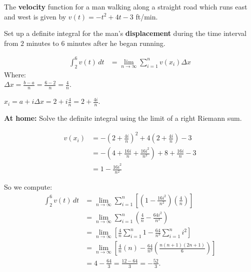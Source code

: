\documentclass[nooutcomes]{ximera}
\renewenvironment{freeResponse}{
\ifhandout\setbox0\vbox\bgroup\else
\begin{trivlist}\item[\hskip \labelsep\bfseries Solution:\hspace{2ex}]
\fi}
{\ifhandout\egroup\else
\end{trivlist}
\fi}
\renewcommand{\d}{\,d}
\newcommand{\dfn}{\textbf}
\begin{document}
\begin{problem}
  The \dfn{velocity} function for a man walking along a straight road which runs east and west is given by $v(t) = -t^2 + 4t - 3$ ft/min.
  \begin{enumerate}
    
  \item  Set up a definite integral for the man's \dfn{displacement} during the time interval from $2$ minutes to $6$ minutes after he began running.
    \begin{freeResponse}
      \begin{align*}
        \int_2^6 v(t) \d t &= \lim_{n \to \infty} \sum_{i=1}^n v(x_i) \Delta x
      \end{align*}
      Where:  \\	
      $\Delta x = \frac{b-a}{n} = \frac{6-2}{n} = \frac{4}{n}$.
      
      $x_i = a + i \Delta x = 2 + i \frac{4}{n} = 2 + \frac{4i}{n}$.
    \end{freeResponse}
    
  \item  \dfn{At home:}  Solve the definite integral using the limit of a right Riemann sum.
    \begin{freeResponse}
      \begin{align*}
        v(x_i) &= -\left(2 + \frac{4i}{n} \right)^2 + 4 \left( 2 + \frac{4i}{n} \right) - 3  \\
               &= - \left( 4 + \frac{16i}{n} + \frac{16i^2}{n^2} \right) + 8 + \frac{16i}{n} - 3  \\
               &= 1 - \frac{16i^2}{n^2}
      \end{align*}
      
      So we compute:
      \begin{align*}
        \int_2^6 v(t) \d t &= \lim_{n \to \infty} \sum_{i=1}^n \left[ \left( 1 - \frac{16i^2}{n^2} \right) \left( \frac{4}{n} \right) \right]  \\
                           &= \lim_{n \to \infty} \sum_{i=1}^n \left( \frac{4}{n} - \frac{64 i^2}{n^3} \right)  \\
                           &= \lim_{n \to \infty} \left[ \frac{4}{n} \sum_{i=1}^n 1 - \frac{64}{n^3} \sum_{i=1}^n i^2 \right]  \\
                           &= \lim_{n \to \infty} \left[ \frac{4}{n} (n) - \frac{64}{n^3} \left( \frac{n(n+1)(2n+1)}{6} \right) \right]  \\
                           &= 4 - \frac{64}{3} = \frac{12-64}{3} = - \frac{52}{3}.
      \end{align*}
    \end{freeResponse}
    

\end{enumerate}
\end{problem}
\end{document}

